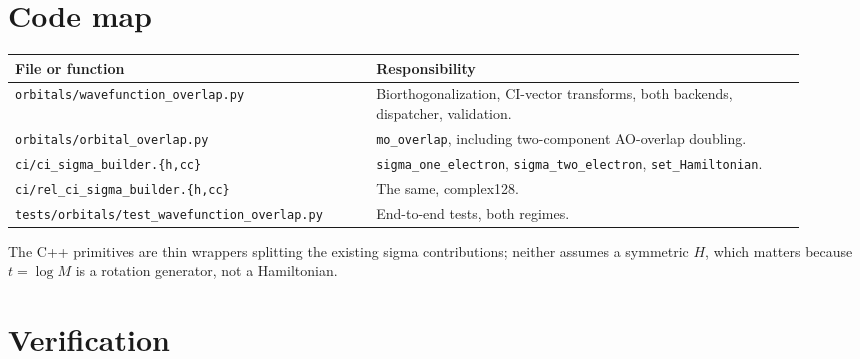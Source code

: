 \documentclass[aip,jcp,preprint]{revtex4-1}
\begin{document}
\section{Code map}

\begin{center}
\begin{tabular}{@{}p{0.42\linewidth}p{0.50\linewidth}@{}}
\toprule
File or function & Responsibility \\
\midrule
\texttt{orbitals/wavefunction\_overlap.py} & Biorthogonalization, CI-vector
transforms, both backends, dispatcher, validation. \\
\texttt{orbitals/orbital\_overlap.py} & \texttt{mo\_overlap}, including
two-component AO-overlap doubling. \\
\texttt{ci/ci\_sigma\_builder.\{h,cc\}} & \texttt{sigma\_one\_electron},
\texttt{sigma\_two\_electron}, \texttt{set\_Hamiltonian}. \\
\texttt{ci/rel\_ci\_sigma\_builder.\{h,cc\}} & The same, complex128. \\
\texttt{tests/orbitals/test\_wavefunction\_overlap.py} & End-to-end tests,
both regimes. \\
\bottomrule
\end{tabular}
\end{center}

The C++ primitives are thin wrappers splitting the existing sigma
contributions; neither assumes a symmetric $H$, which matters because
$t=\log M$ is a rotation generator, not a Hamiltonian.

\section{Verification}
\label{sec:verify}
\end{document}
